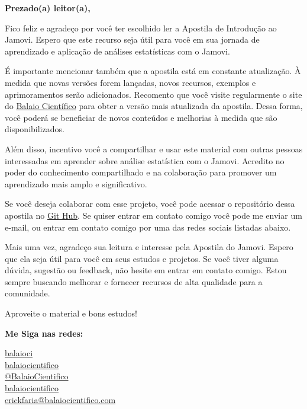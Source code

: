 \begin{flushleft}
\Huge\textbf{Prezado(a) leitor(a),}
\end{flushleft}

Fico feliz e agradeço por você ter escolhido ler a Apostila de Introdução ao Jamovi. Espero que este recurso seja útil para você em sua jornada de aprendizado e aplicação de análises estatísticas com o Jamovi.

É importante mencionar também que a apostila está em constante atualização. À medida que novas versões forem lançadas, novos recursos, exemplos e aprimoramentos serão adicionados. Recomento que você visite regularmente o site do \href{https://www.balaiocientifico.com/jamovi/apostila-de-jamovi/} {Balaio Científico} para obter a versão mais atualizada da apostila. Dessa forma, você poderá se beneficiar de novos conteúdos e melhorias à medida que são disponibilizados.

Além disso, incentivo você a compartilhar e usar este material com outras pessoas interessadas em aprender sobre análise estatística com o Jamovi. Acredito no poder do conhecimento compartilhado e na colaboração para promover um aprendizado mais amplo e significativo.

Se você deseja colaborar com esse projeto, você pode acessar o repositório dessa apostila no \href{https://github.com/balaio-cientifico/apostila_jamovi}{Git Hub}. Se quiser entrar em contato comigo você pode me enviar um e-mail, ou entrar em contato comigo por uma das redes sociais listadas abaixo.

Mais uma vez, agradeço sua leitura e interesse pela Apostila do Jamovi. Espero que ela seja útil para você em seus estudos e projetos. Se você tiver alguma dúvida, sugestão ou feedback, não hesite em entrar em contato comigo. Estou sempre buscando melhorar e fornecer recursos de alta qualidade para a comunidade.

Aproveite o material e bons estudos!

\vfill

\noindent \textbf{Me Siga nas redes:}

\noindent \faTwitter{} \href{https://twitter.com/balaioci}{balaioci} \\
\faFacebook{} \href{https://www.facebook.com/balaiocientifico/}{balaiocientifico} \\
\faYoutube{} \href{https://www.youtube.com/@BalaioCientifico}{@BalaioCientifico} \\
\faInstagram{} \href{https://www.instagram.com/balaiocientifico/}{balaiocientifico} \\
\faEnvelope{} \href{mailto:erickfaria@balaiocientifico.com}{erickfaria@balaiocientifico.com}\\

